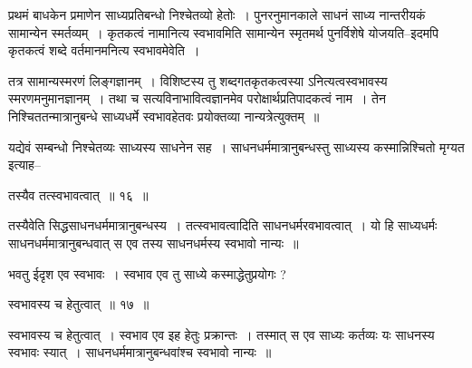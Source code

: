 \documentclass[article,12pt,a4paper]{memoir}
\begin{document}
	प्रथमं बाधकेन प्रमाणेन साध्यप्रतिबन्धो निश्चेतव्यो हेतोः । पुनरनुमानकाले साधनं साध्य नान्तरीयकं सामान्येन स्मर्तव्यम् । कृतकत्वं नामानित्य स्वभावमिति सामान्येन स्मृतमर्थ पुनर्विशेषे योजयति--इदमपि कृतकत्वं शब्दे वर्तमानमनित्य स्वभावमेवेति ।  
	  
	तत्र सामान्यस्मरणं लिङ्गज्ञानम् । विशिष्टस्य तु शब्दगतकृतकत्वस्या ऽनित्यत्वस्वभावस्य स्मरणमनुमानज्ञानम् । तथा च सत्यविनाभावित्वज्ञानमेव परोक्षार्थप्रतिपादकत्वं नाम । तेन निश्चिततन्मात्रानुबन्धे साध्यधर्मे स्वभावहेतवः प्रयोक्तव्या नान्यत्रेत्युक्तम् ॥  
	  
	यद्येवं सम्बन्धो निश्चेतव्यः साध्यस्य साधनेन सह । साधनधर्ममात्रानुबन्धस्तु साध्यस्य कस्मान्निश्चितो मृग्यत इत्याह--  
	  
	तस्यैव तत्स्वभावत्वात् ॥ १६ ॥ 
	  
	तस्यैवेति सिद्धसाधनधर्ममात्रानुबन्धस्य । तत्स्वभावत्वादिति साधनधर्मरवभावत्वात् । यो हि साध्यधर्मः साधनधर्ममात्रानुबन्धवात् स एव तस्य साधनधर्मस्य स्वभावो नान्यः ॥  
	  
	भवतु ईदृश एव स्वभावः । स्वभाव एव तु साध्ये कस्माद्धेतुप्रयोगः ?  
	  
	स्वभावस्य च हेतुत्वात् ॥ १७ ॥ 
	  
	स्वभावस्य च हेतुत्वात् । स्वभाव एव इह हेतुः प्रक्रान्तः । तस्मात् स एव साध्यः कर्तव्यः यः साधनस्य स्वभावः स्यात् । साधनधर्ममात्रानुबन्धवांश्च स्वभावो नान्यः ॥  
	  
\end{document}
